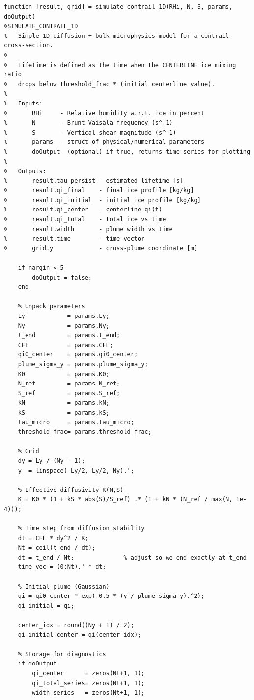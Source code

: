 \documentclass[11pt]{article}
\begin{document}
\begin{verbatim}
function [result, grid] = simulate_contrail_1D(RHi, N, S, params, doOutput)
%SIMULATE_CONTRAIL_1D
%   Simple 1D diffusion + bulk microphysics model for a contrail cross-section.
%
%   Lifetime is defined as the time when the CENTERLINE ice mixing ratio
%   drops below threshold_frac * (initial centerline value).
%
%   Inputs:
%       RHi     - Relative humidity w.r.t. ice in percent
%       N       - Brunt–Väisälä frequency (s^-1)
%       S       - Vertical shear magnitude (s^-1)
%       params  - struct of physical/numerical parameters
%       doOutput- (optional) if true, returns time series for plotting
%
%   Outputs:
%       result.tau_persist - estimated lifetime [s]
%       result.qi_final    - final ice profile [kg/kg]
%       result.qi_initial  - initial ice profile [kg/kg]
%       result.qi_center   - centerline qi(t)
%       result.qi_total    - total ice vs time
%       result.width       - plume width vs time
%       result.time        - time vector
%       grid.y             - cross-plume coordinate [m]

    if nargin < 5
        doOutput = false;
    end

    % Unpack parameters
    Ly            = params.Ly;
    Ny            = params.Ny;
    t_end         = params.t_end;
    CFL           = params.CFL;
    qi0_center    = params.qi0_center;
    plume_sigma_y = params.plume_sigma_y;
    K0            = params.K0;
    N_ref         = params.N_ref;
    S_ref         = params.S_ref;
    kN            = params.kN;
    kS            = params.kS;
    tau_micro     = params.tau_micro;
    threshold_frac= params.threshold_frac;

    % Grid
    dy = Ly / (Ny - 1);
    y  = linspace(-Ly/2, Ly/2, Ny).';

    % Effective diffusivity K(N,S)
    K = K0 * (1 + kS * abs(S)/S_ref) .* (1 + kN * (N_ref / max(N, 1e-4)));

    % Time step from diffusion stability
    dt = CFL * dy^2 / K;
    Nt = ceil(t_end / dt);
    dt = t_end / Nt;              % adjust so we end exactly at t_end
    time_vec = (0:Nt).' * dt;

    % Initial plume (Gaussian)
    qi = qi0_center * exp(-0.5 * (y / plume_sigma_y).^2);
    qi_initial = qi;

    center_idx = round((Ny + 1) / 2);
    qi_initial_center = qi(center_idx);

    % Storage for diagnostics
    if doOutput
        qi_center      = zeros(Nt+1, 1);
        qi_total_series= zeros(Nt+1, 1);
        width_series   = zeros(Nt+1, 1);


\end{verbatim}
\end{document}
